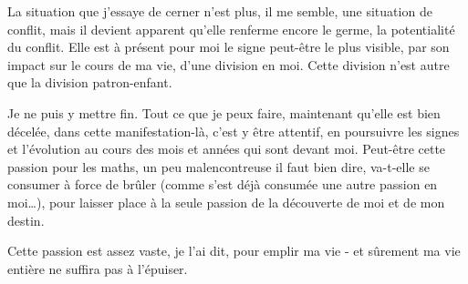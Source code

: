 La situation que j’essaye de cerner n’est plus, il me semble, une situation de conflit, mais il devient apparent qu'elle renferme encore le germe, la potentialité du conflit. Elle est à présent pour moi le signe peut-être le plus visible, par son impact sur le cours de ma vie, d'une division en moi. Cette division n'est autre que la division patron-enfant.

Je ne puis y mettre fin. Tout ce que je peux faire, maintenant qu'elle est bien décelée, dans cette manifestation-là, c'est y être attentif, en poursuivre les signes et l'évolution au cours des mois et années qui sont devant moi. Peut-être cette passion pour les maths, un peu malencontreuse il faut bien dire, va-t-elle se consumer à force de brûler (comme s’est déjà consumée une autre passion en moi…), pour laisser place à la seule passion de la découverte de moi et de mon destin.

Cette passion est assez vaste, je l'ai dit, pour emplir ma vie - et sûrement ma vie entière ne suffira pas à l'épuiser.